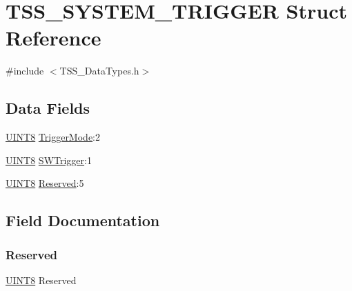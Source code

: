 \hypertarget{struct_t_s_s___s_y_s_t_e_m___t_r_i_g_g_e_r}{}\section{T\+S\+S\+\_\+\+S\+Y\+S\+T\+E\+M\+\_\+\+T\+R\+I\+G\+G\+ER Struct Reference}
\label{struct_t_s_s___s_y_s_t_e_m___t_r_i_g_g_e_r}


{\ttfamily \#include $<$T\+S\+S\+\_\+\+Data\+Types.\+h$>$}

\subsection*{Data Fields}
\begin{DoxyCompactItemize}
\item 
\hyperlink{_t_s_s___data_types_8h_ab27e9918b538ce9d8ca692479b375b6a}{U\+I\+N\+T8} \hyperlink{struct_t_s_s___s_y_s_t_e_m___t_r_i_g_g_e_r_ad163c487f9a327c2f601395ede511260}{Trigger\+Mode}\+:2
\item 
\hyperlink{_t_s_s___data_types_8h_ab27e9918b538ce9d8ca692479b375b6a}{U\+I\+N\+T8} \hyperlink{struct_t_s_s___s_y_s_t_e_m___t_r_i_g_g_e_r_a054deb7afa5a189f11eacd063aaf4a79}{S\+W\+Trigger}\+:1
\item 
\hyperlink{_t_s_s___data_types_8h_ab27e9918b538ce9d8ca692479b375b6a}{U\+I\+N\+T8} \hyperlink{struct_t_s_s___s_y_s_t_e_m___t_r_i_g_g_e_r_ae22fefb28906adc9a7d097ac434d2cf9}{Reserved}\+:5
\end{DoxyCompactItemize}


\subsection{Field Documentation}
\mbox{\label{struct_t_s_s___s_y_s_t_e_m___t_r_i_g_g_e_r_ae22fefb28906adc9a7d097ac434d2cf9}} 
\subsubsection{\texorpdfstring{Reserved}{Reserved}}
{\footnotesize\ttfamily \hyperlink{_t_s_s___data_types_8h_ab27e9918b538ce9d8ca692479b375b6a}{U\+I\+N\+T8} Reserved}

